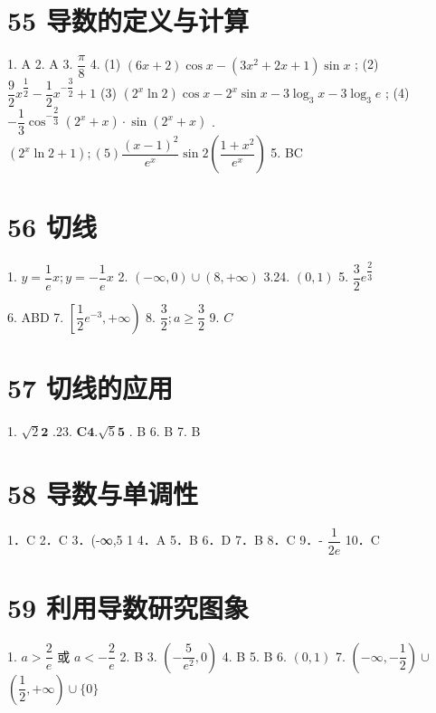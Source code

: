 \documentclass[10pt]{article}
\begin{document}
\section*{55 导数的定义与计算}

1. A 2. A 3. $\dfrac{\pi }{8}$ 4. (1) $\left( {{6x} + 2}\right) \cos x - \left( {3{x}^{2} + {2x} + 1}\right) \sin x$ ; (2) $\dfrac{9}{2}{x}^{\dfrac{1}{2}} - \dfrac{1}{2}{x}^{-\dfrac{3}{2}} +1$ (3) $\left( {{2}^{x}\ln 2}\right) \cos x - {2}^{x}\sin x - 3{\log }_{3}x - 3{\log }_{3}{e}$ ; (4) $- \dfrac{1}{3}{\cos }^{-\dfrac{2}{3}}\left( {{2}^{x} + x}\right)  \cdot  \sin \left( {{2}^{x} + x}\right)$ . $\left( {{2}^{x}\ln 2 + 1}\right) ;\left( 5\right) \dfrac{{\left( x - 1\right) }^{2}}{{{e}}^{x}}\sin 2\left( \dfrac{1 + {x}^{2}}{{{e}}^{x}}\right) $ 5. BC

\section*{56 切线}

1. $y = \dfrac{1}{{e}}x;y =  - \dfrac{1}{{e}}x$ 2. $\left( {-\infty ,0}\right)  \cup  \left( {8, + \infty }\right) $ 3.24. $\left( {0,1}\right) $ 5. $\dfrac{3}{2}{{e}}^{\dfrac{2}{3}}$

6. ABD 7. $\left\lbrack  {\dfrac{1}{2}{{e}}^{-3}, + \infty }\right) $ 8. $\dfrac{3}{2};a \geq  \dfrac{3}{2}$ 9. ${C}$

\section*{57 切线的应用}

1. $\sqrt{2}\mathbf{2}$ .23. $\mathbf{C}\mathbf{4}.\sqrt{5}\mathbf{5}$ . B 6. B 7. B

\section*{58 导数与单调性}

1．C 2．C 3．(-∞,5 1 4．A 5．B 6．D 7．B 8．C 9．- $\dfrac{1}{2{e}}$ 10．C

\section*{59 利用导数研究图象}

1. $a > \dfrac{2}{{e}}$ 或 $a <  - \dfrac{2}{{e}}$ 2. B 3. $\left( {-\dfrac{5}{{{e}}^{2}},0}\right) $ 4. B 5. B 6. $\left( {0,1}\right) $ 7. $\left( {-\infty , - \dfrac{1}{2}}\right)  \cup$  $\left( {\dfrac{1}{2}, + \infty }\right)  \cup  \{ 0\}$
\end{document}

